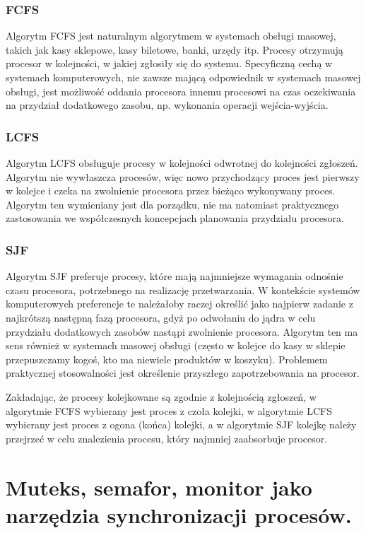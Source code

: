 \documentclass[main.tex]{subfiles}
\begin{document}
    \subsubsection{FCFS}
    Algorytm FCFS jest naturalnym algorytmem w systemach obsługi masowej, takich jak kasy sklepowe, kasy biletowe, banki, urzędy itp. Procesy otrzymują procesor w kolejności, w jakiej zgłosiły się do systemu. Specyficzną cechą w systemach komputerowych, nie zawsze mającą odpowiednik w systemach masowej obsługi, jest możliwość oddania procesora innemu procesowi na czas oczekiwania na przydział dodatkowego zasobu, np. wykonania operacji wejścia-wyjścia.

    \subsubsection{LCFS}
    Algorytm LCFS obsługuje procesy w kolejności odwrotnej do kolejności zgłoszeń. Algorytm nie wywłaszcza procesów, więc nowo przychodzący proces jest pierwszy w kolejce i czeka na zwolnienie procesora przez bieżąco wykonywany proces. Algorytm ten wymieniany jest dla porządku, nie ma natomiast praktycznego zastosowania we współczesnych koncepcjach planowania przydziału procesora.

    \subsubsection{SJF}
    Algorytm SJF preferuje procesy, które mają najmniejsze wymagania odnośnie czasu procesora, potrzebnego na realizację przetwarzania. W kontekście systemów komputerowych preferencje te należałoby raczej określić jako najpierw zadanie z najkrótszą następną fazą procesora, gdyż po odwołaniu do jądra w celu przydziału dodatkowych zasobów nastąpi zwolnienie procesora. Algorytm ten ma sens również w systemach masowej obsługi (często w kolejce do kasy w sklepie przepuszczamy kogoś, kto ma niewiele produktów w koszyku). Problemem praktycznej stosowalności jest określenie przyszłego zapotrzebowania na procesor.

    Zakładając, że procesy kolejkowane są zgodnie z kolejnością zgłoszeń, w algorytmie FCFS wybierany jest proces z czoła kolejki, w algorytmie LCFS wybierany jest proces z ogona (końca) kolejki, a w algorytmie SJF kolejkę należy przejrzeć w celu znalezienia procesu, który najmniej zaabsorbuje procesor.

    \newpage
    \section{Muteks, semafor, monitor jako narzędzia synchronizacji procesów.}
\end{document}
